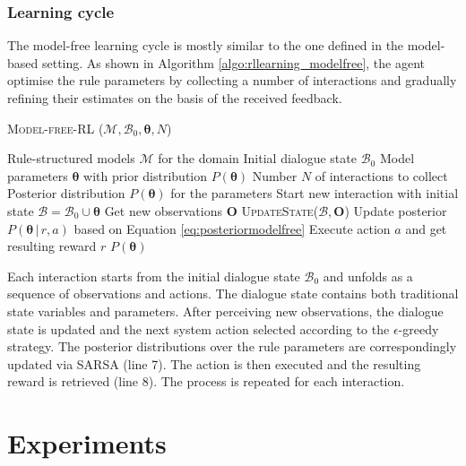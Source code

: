 \subsubsection*{Learning cycle}

The model-free learning cycle is mostly similar to the one defined in the model-based setting.  As shown in Algorithm \ref{algo:rllearning_modelfree}, the agent optimise the rule parameters by collecting a number of interactions and gradually refining their estimates on the basis of the received feedback. 

\begin{algorithm}[ht]
\caption{\textsc{Model-free-RL} ($\mathcal{M}, \mathcal{B}_0, \boldsymbol\theta, N$)}
\begin{algorithmic}[1]\vspace{1mm}
\REQUIRE Rule-structured models $\mathcal{M}$ for the domain
\REQUIRE Initial dialogue state $\mathcal{B}_0$
\REQUIRE Model parameters $\boldsymbol\theta$ with prior distribution $P(\boldsymbol\theta)$
\REQUIRE Number $N$ of interactions to collect
\ENSURE Posterior distribution $P(\boldsymbol\theta)$ for the parameters  \vspace{1mm}
\STATE Start new interaction with initial state $\mathcal{B} = \mathcal{B}_0 \cup \boldsymbol\theta $
\STATE Get new observations $\mathbf{O}$
\STATE \textsc{UpdateState}($\mathcal{B}, \mathbf{O}$)
\STATE Update posterior $P(\boldsymbol\theta \, | \, r, a)$ based on Equation \eqref{eq:posteriormodelfree}
\STATE Execute action $a$ and get resulting reward $r$
\ENDIF
\ENDWHILE
\ENDFOR
\RETURN $P(\boldsymbol\theta)$
\end{algorithmic} 
\label{algo:rllearning_modelfree}
\end{algorithm}

Each interaction starts from the initial dialogue state $\mathcal{B}_0$ and unfolds as a sequence of observations and actions.  The dialogue state contains both traditional state variables and parameters.  After perceiving new observations, the dialogue state is updated and the next system action selected according to the $\epsilon$-greedy strategy. The posterior distributions over the rule parameters are correspondingly updated via SARSA (line 7). The action is then executed and the resulting reward is retrieved (line 8).  The process is repeated for each interaction. 

\section{Experiments}
\label{sec:rllearning-experiments}

